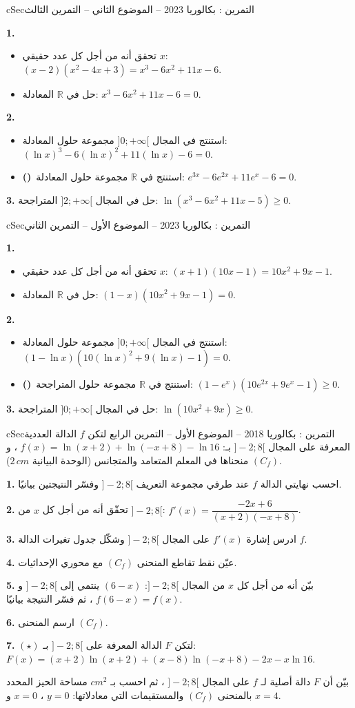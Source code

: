 \documentclass[12pt,a4paper]{article}
\newenvironment{BOX}[2]{\begin{otherlanguage}{english}\begin{arbox}{#1}{#2}}{\end{arbox}\end{otherlanguage}}
\newcounter{exo}
\newenvironment{tamrin}[1]{\stepcounter{exo}\begin{BOX}{cSec}{التمرين \theexo: #1}}{\end{BOX}}
\newcommand{\R}{\mathbb{R}}
\newenvironment{sq}{\begin{itemize}[leftmargin=2.4em,itemsep=3pt]}{\end{itemize}}
\newcommand{\qa}{\item[(أ)]}\newcommand{\qb}{\item[(ب)]}\newcommand{\qc}{\item[(جـ)]}\newcommand{\qd}{\item[(د)]}\newcommand{\qe}{\item[(هـ)]}
\newcommand{\QQ}[1]{\par\smallskip\textbf{#1.} }
\newcommand{\EXP}{\textcolor{cThm}{\textbf{(\ding{72}\ding{72})}}}
\begin{document}
\begin{tamrin}{بكالوريا 2023 -- الموضوع الثاني -- التمرين الثالث}
\QQ{1}
\begin{sq}
\qa تحقق أنه من أجل كل عدد حقيقي $x$: $(x-2)\left(x^2-4x+3\right)=x^3-6x^2+11x-6$.
\qb حل في $\R$ المعادلة: $x^3-6x^2+11x-6=0$.
\end{sq}
\QQ{2}
\begin{sq}
\qa استنتج في المجال $]0;+\infty[$ مجموعة حلول المعادلة: $(\ln x)^3-6(\ln x)^2+11(\ln x)-6=0$.
\qb \EXP\ استنتج في $\R$ مجموعة حلول المعادلة: $e^{3x}-6e^{2x}+11e^x-6=0$.
\end{sq}
\QQ{3} حل في المجال $]2;+\infty[$ المتراجحة: $\ln\left(x^3-6x^2+11x-5\right)\geqslant0$.
\end{tamrin}

\begin{tamrin}{بكالوريا 2023 -- الموضوع الأول -- التمرين الثاني}
\QQ{1}
\begin{sq}
\qa تحقق أنه من أجل كل عدد حقيقي $x$: $(x+1)(10x-1)=10x^2+9x-1$.
\qb حل في $\R$ المعادلة: $(1-x)\left(10x^2+9x-1\right)=0$.
\end{sq}
\QQ{2}
\begin{sq}
\qa استنتج في المجال $]0;+\infty[$ مجموعة حلول المعادلة: $(1-\ln x)\left(10(\ln x)^2+9(\ln x)-1\right)=0$.
\qb \EXP\ استنتج في $\R$ مجموعة حلول المتراجحة: $\left(1-e^x\right)\left(10e^{2x}+9e^x-1\right)\geqslant0$.
\end{sq}
\QQ{3} حل في المجال $]0;+\infty[$ المتراجحة: $\ln\left(10x^2+9x\right)\geqslant0$.
\end{tamrin}

\begin{tamrin}{بكالوريا 2018 -- الموضوع الأول -- التمرين الرابع}
لتكن $f$ الدالة العددية المعرفة على المجال $]-2;8[$ بـ: $f(x)=\ln(x+2)+\ln(-x+8)-\ln16$ ، و $(C_f)$ منحناها في المعلم المتعامد والمتجانس (الوحدة البيانية $2\,cm$).
\QQ{1} احسب نهايتي الدالة $f$ عند طرفي مجموعة التعريف $]-2;8[$ وفسّر النتيجتين بيانيًا.
\QQ{2} تحقّق أنه من أجل كل $x$ من $]-2;8[$: $f'(x)=\dfrac{-2x+6}{(x+2)(-x+8)}$.
\QQ{3} ادرس إشارة $f'(x)$ على المجال $]-2;8[$ وشكّل جدول تغيرات الدالة $f$.
\QQ{4} عيّن نقط تقاطع المنحنى $(C_f)$ مع محوري الإحداثيات.
\QQ{5} بيّن أنه من أجل كل $x$ من المجال $]-2;8[$: $(6-x)$ ينتمي إلى $]-2;8[$ و $f(6-x)=f(x)$ ، ثم فسّر النتيجة بيانيًا.
\QQ{6} ارسم المنحنى $(C_f)$.
\QQ{7} $(\star)$ لتكن $F$ الدالة المعرفة على $]-2;8[$ بـ: $F(x)=(x+2)\ln(x+2)+(x-8)\ln(-x+8)-2x-x\ln16$.\par
بيّن أن $F$ دالة أصلية لـ $f$ على المجال $]-2;8[$ ، ثم احسب بـ $cm^2$ مساحة الحيز المحدد بالمنحنى $(C_f)$ والمستقيمات التي معادلاتها: $y=0$ ، $x=0$ و $x=4$.
\end{tamrin}
\end{document}
